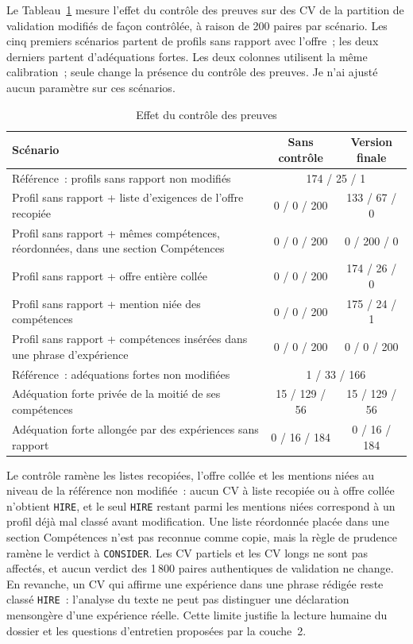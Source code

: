 Le Tableau~\ref{tab:chap4-robustesse} mesure l'effet du contrôle des preuves sur des CV de la partition de validation modifiés de façon contrôlée, à raison de 200 paires par scénario. Les cinq premiers scénarios partent de profils sans rapport avec l'offre~; les deux derniers partent d'adéquations fortes. Les deux colonnes utilisent la même calibration~; seule change la présence du contrôle des preuves. Je n'ai ajusté aucun paramètre sur ces scénarios.

\begin{table}[htbp]
  \centering
  \footnotesize
  \caption{Effet du contrôle des preuves}
  \label{tab:chap4-robustesse}
  \begin{tabular}{|p{7.2cm}|c|c|}
    \hline
    Scénario & Sans contrôle & Version finale \\
    \hline
    Référence~: profils sans rapport non modifiés & \multicolumn{2}{c|}{174 / 25 / 1} \\
    \hline
    Profil sans rapport + liste d'exigences de l'offre recopiée & 0 / 0 / 200 & 133 / 67 / 0 \\
    \hline
    Profil sans rapport + mêmes compétences, réordonnées, dans une section Compétences & 0 / 0 / 200 & 0 / 200 / 0 \\
    \hline
    Profil sans rapport + offre entière collée & 0 / 0 / 200 & 174 / 26 / 0 \\
    \hline
    Profil sans rapport + mention niée des compétences & 0 / 0 / 200 & 175 / 24 / 1 \\
    \hline
    Profil sans rapport + compétences insérées dans une phrase d'expérience & 0 / 0 / 200 & 0 / 0 / 200 \\
    \hline
    Référence~: adéquations fortes non modifiées & \multicolumn{2}{c|}{1 / 33 / 166} \\
    \hline
    Adéquation forte privée de la moitié de ses compétences & 15 / 129 / 56 & 15 / 129 / 56 \\
    \hline
    Adéquation forte allongée par des expériences sans rapport & 0 / 16 / 184 & 0 / 16 / 184 \\
    \hline
  \end{tabular}
\end{table}

Le contrôle ramène les listes recopiées, l'offre collée et les mentions niées au niveau de la référence non modifiée~: aucun CV à liste recopiée ou à offre collée n'obtient \texttt{HIRE}, et le seul \texttt{HIRE} restant parmi les mentions niées correspond à un profil déjà mal classé avant modification. Une liste réordonnée placée dans une section Compétences n'est pas reconnue comme copie, mais la règle de prudence ramène le verdict à \texttt{CONSIDER}. Les CV partiels et les CV longs ne sont pas affectés, et aucun verdict des 1\,800 paires authentiques de validation ne change. En revanche, un CV qui affirme une expérience dans une phrase rédigée reste classé \texttt{HIRE}~: l'analyse du texte ne peut pas distinguer une déclaration mensongère d'une expérience réelle. Cette limite justifie la lecture humaine du dossier et les questions d'entretien proposées par la couche~2.

